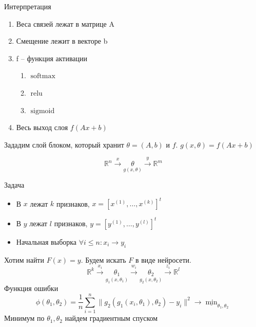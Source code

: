 \documentclass{beamer}
\newcommand{\relu}{\operatorname{relu}}
\newcommand{\softmax}{\operatorname{softmax}}
\newcommand{\sigmoid}{\operatorname{sigmoid}}
\newcommand{\R} {\mathbb{R}}
\newcommand{\Sum}[2]{\overset{#2}{\underset{#1}{\sum}}}
\begin{document}
\begin{frame}{Интерпретация}
        \begin{enumerate}
            \item Веса связей лежат в матрице A \pause
            \item Смещение лежит в векторе b \pause
            \item f -- функция активации \pause
            \begin{enumerate}
                \item $\softmax$
                \item $\relu$
                \item $\sigmoid$
            \end{enumerate} \pause
            \item Весь выход слоя $f(Ax + b)$ \pause
        \end{enumerate}
        \begin{center}
            Зададим слой блоком, который хранит $\theta = (A, b)$ и $f$. $g(x, \theta) = f(Ax + b)$

            $$
                \R^n \xrightarrow[]{x} \underset{g(x, \theta)}{\boxed{\theta}} \xrightarrow[]{y} \R^m
            $$
        \end{center}
\end{frame}

\begin{frame}{Задача}
    \begin{itemize}
        \item В $x$ лежат $k$ признаков, $x = [x^{(1)}, \dots, x^{(k)}]^t$ \pause
        \item В $y$ лежат $l$ признаков, $y = [y^{(1)}, \dots, y^{(l)}]^t$ \pause
        \item Начальная выборка $\forall i \le n: x_i \rightarrow y_i$ \pause
    \end{itemize}

    \begin{center}
        Хотим найти $F(x) = y$. Будем искать $F$ в виде нейросети. \pause
        $$
        \R^k \xrightarrow[]{x_i} \underset{g_1(x, \theta_1)}{\boxed{\theta_1}} \xrightarrow[]{w_i} \underset{g_2(x, \theta_2)}{\boxed{\theta_2}} \xrightarrow[]{z_i} \R^l
        $$
        Функция ошибки
        $$
        \phi(\theta_1, \theta_2) = \frac{1}{n}\Sum{i = 1}{n} \|g_2(g_1(x_i, \theta_1), \theta_2) - y_i\|^2 \rightarrow \underline{\min}_{\theta_1, \theta_2}
        $$
        Минимум по $\theta_1, \theta_2$ найдем градиентным спуском
        \end{center}
\end{frame}
\end{document}
